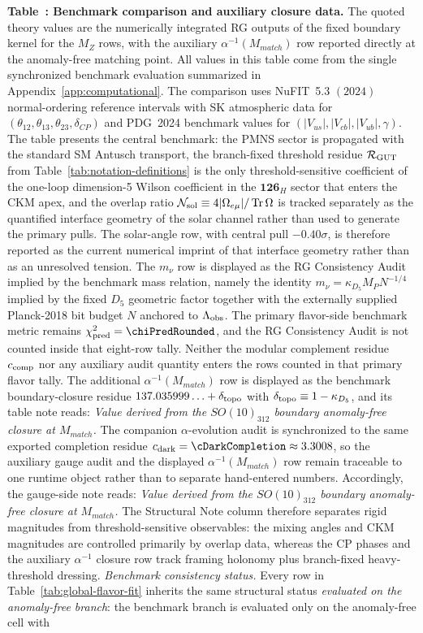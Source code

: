 \documentclass[11pt]{article}
\renewcommand{\Tr}{\operatorname{Tr}}
\begin{document}
\noindent
{}\label{tab:global-flavor-fit}
\textbf{Table~\thetable: Benchmark comparison and auxiliary closure data.}
The quoted theory values are the numerically integrated RG outputs of the fixed boundary kernel for the $M_Z$ rows, with the auxiliary $\alpha^{-1}(M_{match})$ row reported directly at the anomaly-free matching point. All values in this table come from the single synchronized benchmark evaluation summarized in Appendix~\ref{app:computational}. The comparison uses NuFIT~5.3 $(2024)$ normal-ordering reference intervals with SK atmospheric data for $(\theta_{12},\theta_{13},\theta_{23},\delta_{CP})$ and PDG~2024 benchmark values for $(|V_{us}|,|V_{cb}|,|V_{ub}|,\gamma)$. The table presents the central benchmark: the PMNS sector is propagated with the standard SM Antusch transport, the branch-fixed threshold residue $\mathcal R_{\rm GUT}$ from Table~\ref{tab:notation-definitions} is the only threshold-sensitive coefficient of the one-loop dimension-5 Wilson coefficient in the $\mathbf{126}_H$ sector that enters the CKM apex, and the overlap ratio $\mathcal N_{\rm sol}\equiv4|\Omega_{e\mu}|/\Tr\Omega$ is tracked separately as the quantified interface geometry of the solar channel rather than used to generate the primary pulls. The solar-angle row, with central pull $-0.40\sigma$, is therefore reported as the current numerical imprint of that interface geometry rather than as an unresolved tension. The $m_\nu$ row is displayed as the RG Consistency Audit implied by the benchmark mass relation, namely the identity $m_\nu=\kappa_{D_5}M_PN^{-1/4}$ implied by the fixed $D_5$ geometric factor together with the externally supplied Planck-2018 bit budget $N$ anchored to $\Lambda_{\rm obs}$. The primary flavor-side benchmark metric remains $\chi_{\rm pred}^2=\chiPredRounded$, and the RG Consistency Audit is not counted inside that eight-row tally. Neither the modular complement residue $c_{\rm comp}$ nor any auxiliary audit quantity enters the rows counted in that primary flavor tally. The additional $\alpha^{-1}(M_{match})$ row is displayed as the benchmark boundary-closure residue $137.035999\ldots+\delta_{\rm topo}$ with $\delta_{\rm topo}\equiv1-\kappa_{D_5}$, and its table note reads: \emph{Value derived from the $SO(10)_{312}$ boundary anomaly-free closure at $M_{match}$.} The companion $\alpha$-evolution audit is synchronized to the same exported completion residue $c_{\rm dark}=\cDarkCompletion\approx3.3008$, so the auxiliary gauge audit and the displayed $\alpha^{-1}(M_{match})$ row remain traceable to one runtime object rather than to separate hand-entered numbers. Accordingly, the gauge-side note reads: \emph{Value derived from the $SO(10)_{312}$ boundary anomaly-free closure at $M_{match}$.} The Structural Note column therefore separates rigid magnitudes from threshold-sensitive observables: the mixing angles and CKM magnitudes are controlled primarily by overlap data, whereas the CP phases and the auxiliary $\alpha^{-1}$ closure row track framing holonomy plus branch-fixed heavy-threshold dressing. \emph{Benchmark consistency status.} Every row in Table~\ref{tab:global-flavor-fit} inherits the same structural status \textit{evaluated on the anomaly-free branch}: the benchmark branch is evaluated only on the anomaly-free cell with 
\end{document}

